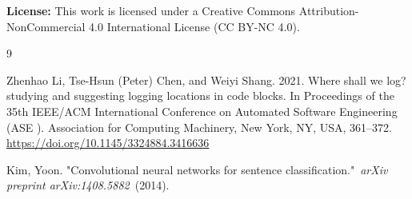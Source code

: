 \documentclass[11pt]{article}
\begin{document}
\newpage
\noindent \textbf{License:} This work is licensed under a Creative Commons Attribution-NonCommercial 4.0 International License (CC BY-NC 4.0).
\begin{thebibliography}{9}


Zhenhao Li, Tse-Hsun (Peter) Chen, and Weiyi Shang. 2021. Where shall we
log? studying and suggesting logging locations in code blocks. In
Proceedings of the 35th IEEE/ACM International Conference on Automated
Software Engineering (ASE ). Association for Computing
Machinery, New York, NY, USA, 361--372.
\url{https://doi.org/10.1145/3324884.3416636}


Kim, Yoon. "Convolutional neural networks for sentence
classification."~\emph{arXiv preprint arXiv:1408.5882}~(2014).

\end{thebibliography}
\end{document}
